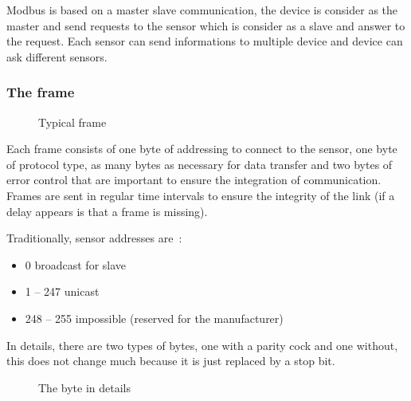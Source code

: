 				Modbus is based on a master slave communication, the device is consider as the master and send requests to the sensor which is consider as a slave and answer to the request. Each sensor can send informations to multiple device and device can ask different sensors. 
				
			\subsubsection{The frame}
			
				\begin{figure}[H]
					\qquad
					\caption{Typical frame~\cite{Modbus-protocol}}
					\label{fig:hw-components}
				\end{figure}
				
				Each frame consists of one byte of addressing to connect to the sensor, one byte of protocol type, as many bytes as necessary for data transfer and two bytes of error control that are important to ensure the integration of communication. Frames are sent in regular time intervals to ensure the integrity of the link (if a delay appears is that a frame is missing).
				
				Traditionally, sensor addresses are~\cite{Modbus-protocol}:
				\begin{itemize}
					\item 0 broadcast for slave
					\item 1 – 247 unicast
					\item 248 – 255 impossible (reserved for the manufacturer)
				
				\end{itemize}
				
				In details, there are two types of bytes, one with a parity cock and one without, this does not change much because it is just replaced by a stop bit.
				
				\begin{figure}[H]
					\qquad
					\caption{The byte in details~\cite{Modbus-protocol}}
					\label{fig:byte-parity5}
				\end{figure}
		
